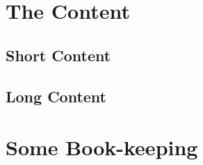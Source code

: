 \documentclass{article}
\begin{document}
\section{The Content}

\subsection{Short Content}



\subsection{Long Content}



\appendix

\section{Some Book-keeping}
\end{document}

